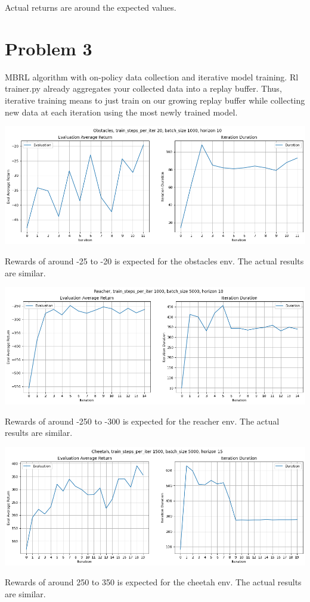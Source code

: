 \documentclass[11pt]{article}
\begin{document}
    Actual returns are around the expected values.

    \section*{Problem 3}

    MBRL algorithm with on-policy data collection and iterative model training.
    Rl trainer.py already aggregates your collected data into a replay buffer.
    Thus, iterative training means to just train on our growing replay buffer while collecting new data at each iteration using the most newly trained model.

    \hspace*{-0.6in}
    \includegraphics[scale=0.5]{q3/obstacles}

    Rewards of around -25 to -20 is expected for the obstacles env.
    The actual results are similar.

    \hspace*{-0.6in}
    \includegraphics[scale=0.5]{q3/reacher}

    Rewards of around -250 to -300 is expected for the reacher env.
    The actual results are similar.

    \hspace*{-0.6in}
    \includegraphics[scale=0.5]{q3/cheetah}

    Rewards of around 250 to 350 is expected for the cheetah env.
    The actual results are similar.
\end{document}
